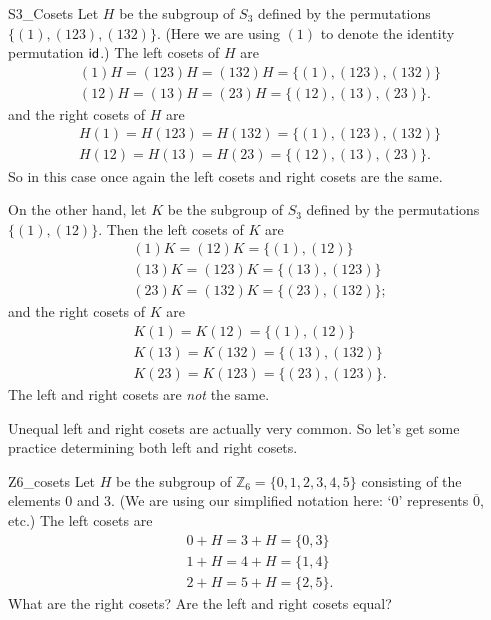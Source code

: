 \begin{example}{S3_Cosets}
Let $H$ be the subgroup of $S_3$ defined by the permutations $\{(1), (123), (132) \}$.  (Here we are using $(1)$ to denote the identity permutation ${\sf{i}d}$.) The left cosets of $H$ are 
\begin{gather*}
(1)H = (1 2 3)H =  (132)H = \{(1), (1 23), (132) \} \\
(1 2)H = (1 3)H = (2 3)H =  \{ (1 2), (1 3), (2 3)  \}.
\end{gather*}
and the right cosets of $H$ are
\begin{gather*}
H(1) = H(1 2 3) =  H(132) = \{(1), (1 23), (132) \} \\
H(1 2) = H(1 3) = H(2 3) =  \{ (1 2), (1 3), (2 3)  \}.
\end{gather*}
So in this case once again the left cosets and right cosets are the same.

On the other hand, let $K$ be the subgroup of $S_3$ defined by the permutations $\{(1), (1 2)\}$.  Then the left cosets of $K$ are
\begin{gather*}
(1)K = (1 2)K = \{(1), (1 2)\} \\
(1 3)K = (1 2 3)K = \{(1 3), (1 2 3)\} \\
(2 3)K = (1 3 2)K = \{(2 3), (1 3 2)\};
\end{gather*}
and the right cosets of $K$ are
\begin{gather*}
K(1) = K(1 2) = \{(1), (1 2)\} \\
K(1 3) = K(1 3 2) = \{(1 3), (1 3 2)\} \\
K(2 3) = K(1 2 3) = \{(2 3), (1 2 3)\}.
\end{gather*}
The left and right cosets are \emph{not} the same. 
\end{example}

Unequal left and right cosets are actually very common.  So let's get some practice determining both left and right cosets.

\begin{exercise}{Z6_cosets}
Let $H$ be the subgroup of ${\mathbb Z}_6 = \{0,1,2,3,4,5\}$ consisting of the elements 0 and 3.
(We are using our simplified notation here: `0' represents $\overline{0}$, etc.)  The left cosets are 
\begin{gather*}
0 + H = 3 + H = \{ 0, 3 \} \\
1 + H = 4 + H = \{ 1, 4 \} \\
2 + H = 5 + H = \{ 2, 5 \}.
\end{gather*}
What are the right cosets? Are the left and right cosets equal?
\end{exercise}

